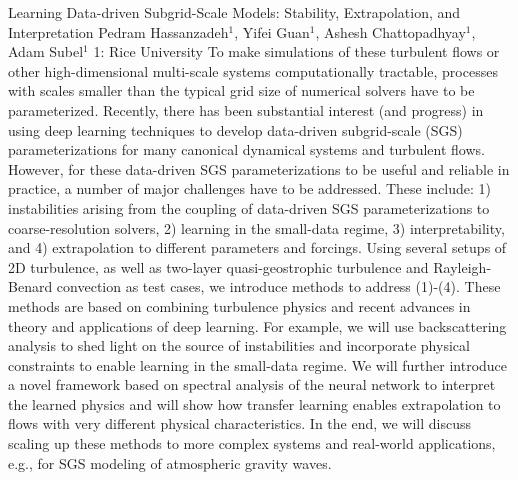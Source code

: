 \begin{addmargin}[2em]{0em}
\vspace{1.5ex}
\abs
{Learning Data-driven Subgrid-Scale Models: Stability, Extrapolation, and Interpretation}
{Pedram Hassanzadeh$^{1}$, Yifei Guan$^{1}$,  Ashesh Chattopadhyay$^{1}$, Adam Subel$^{1}$ }
{1: Rice University}
{To make simulations of these turbulent flows or other high-dimensional multi-scale systems computationally tractable, processes with scales smaller than the typical grid size of numerical solvers have to be parameterized. Recently, there has been substantial interest (and progress) in using deep learning techniques to develop data-driven subgrid-scale (SGS) parameterizations for many canonical dynamical systems and turbulent flows. However, for these data-driven SGS parameterizations to be useful and reliable in practice, a number of major challenges have to be addressed. These include: 1) instabilities arising from the coupling of data-driven SGS parameterizations to coarse-resolution solvers, 2) learning in the small-data regime, 3) interpretability, and 4) extrapolation to different parameters and forcings. Using several setups of 2D turbulence, as well as two-layer quasi-geostrophic turbulence and Rayleigh-Benard convection as test cases, we introduce methods to address (1)-(4). These methods are based on combining turbulence physics and recent advances in theory and applications of deep learning. For example, we will use backscattering analysis to shed light on the source of instabilities and incorporate physical constraints to enable learning in the small-data regime. We will further introduce a novel framework based on spectral analysis of the neural network to interpret the learned physics and will show how transfer learning enables extrapolation to flows with very different physical characteristics. In the end, we will discuss scaling up these methods to more complex systems and real-world applications, e.g., for SGS modeling of atmospheric gravity waves.}



\end{addmargin}
